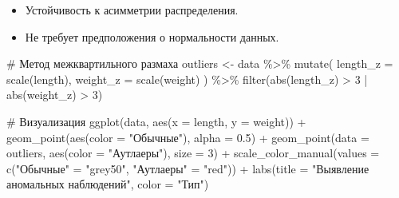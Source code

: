 \documentclass[
  letterpaper,
  DIV=11,
  numbers=noendperiod]{scrreprt}
\newenvironment{Shaded}{\begin{snugshade}}{\end{snugshade}}
\newcommand{\AttributeTok}[1]{\textcolor[rgb]{0.40,0.45,0.13}{#1}}
\newcommand{\CommentTok}[1]{\textcolor[rgb]{0.37,0.37,0.37}{#1}}
\newcommand{\DecValTok}[1]{\textcolor[rgb]{0.68,0.00,0.00}{#1}}
\newcommand{\FloatTok}[1]{\textcolor[rgb]{0.68,0.00,0.00}{#1}}
\newcommand{\FunctionTok}[1]{\textcolor[rgb]{0.28,0.35,0.67}{#1}}
\newcommand{\NormalTok}[1]{\textcolor[rgb]{0.00,0.23,0.31}{#1}}
\newcommand{\OtherTok}[1]{\textcolor[rgb]{0.00,0.23,0.31}{#1}}
\newcommand{\SpecialCharTok}[1]{\textcolor[rgb]{0.37,0.37,0.37}{#1}}
\newcommand{\StringTok}[1]{\textcolor[rgb]{0.13,0.47,0.30}{#1}}
\begin{document}
\begin{itemize}
\item
  Устойчивость к асимметрии распределения.
\item
  Не требует предположения о нормальности данных.
\end{itemize}

\begin{Shaded}
\begin{Highlighting}[]
\CommentTok{\# Метод межквартильного размаха}
\NormalTok{outliers }\OtherTok{\textless{}{-}}\NormalTok{ data }\SpecialCharTok{\%\textgreater{}\%}
  \FunctionTok{mutate}\NormalTok{(}
    \AttributeTok{length\_z =} \FunctionTok{scale}\NormalTok{(length),}
    \AttributeTok{weight\_z =} \FunctionTok{scale}\NormalTok{(weight)}
\NormalTok{  ) }\SpecialCharTok{\%\textgreater{}\%} 
  \FunctionTok{filter}\NormalTok{(}\FunctionTok{abs}\NormalTok{(length\_z) }\SpecialCharTok{\textgreater{}} \DecValTok{3} \SpecialCharTok{|} \FunctionTok{abs}\NormalTok{(weight\_z) }\SpecialCharTok{\textgreater{}} \DecValTok{3}\NormalTok{)}

\CommentTok{\# Визуализация}
\FunctionTok{ggplot}\NormalTok{(data, }\FunctionTok{aes}\NormalTok{(}\AttributeTok{x =}\NormalTok{ length, }\AttributeTok{y =}\NormalTok{ weight)) }\SpecialCharTok{+}
  \FunctionTok{geom\_point}\NormalTok{(}\FunctionTok{aes}\NormalTok{(}\AttributeTok{color =} \StringTok{"Обычные"}\NormalTok{), }\AttributeTok{alpha =} \FloatTok{0.5}\NormalTok{) }\SpecialCharTok{+}
  \FunctionTok{geom\_point}\NormalTok{(}\AttributeTok{data =}\NormalTok{ outliers, }\FunctionTok{aes}\NormalTok{(}\AttributeTok{color =} \StringTok{"Аутлаеры"}\NormalTok{), }\AttributeTok{size =} \DecValTok{3}\NormalTok{) }\SpecialCharTok{+}
  \FunctionTok{scale\_color\_manual}\NormalTok{(}\AttributeTok{values =} \FunctionTok{c}\NormalTok{(}\StringTok{"Обычные"} \OtherTok{=} \StringTok{"grey50"}\NormalTok{, }\StringTok{"Аутлаеры"} \OtherTok{=} \StringTok{"red"}\NormalTok{)) }\SpecialCharTok{+}
  \FunctionTok{labs}\NormalTok{(}\AttributeTok{title =} \StringTok{"Выявление аномальных наблюдений"}\NormalTok{, }\AttributeTok{color =} \StringTok{"Тип"}\NormalTok{)}
\end{Highlighting}
\end{Shaded}
\end{document}
